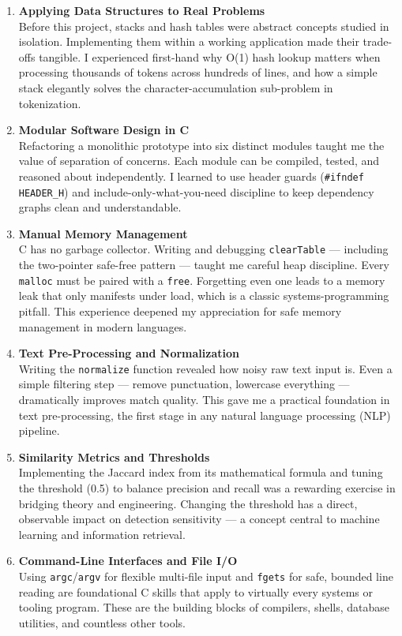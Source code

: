 \documentclass[12pt,a4paper]{article}
\begin{document}
\begin{enumerate}[leftmargin=1.8cm, label=\textbf{\arabic*.}, itemsep=8pt]

  \item \textbf{Applying Data Structures to Real Problems}\\
  Before this project, stacks and hash tables were abstract concepts studied in isolation. Implementing them within a working application made their trade-offs tangible. I experienced first-hand why O(1) hash lookup matters when processing thousands of tokens across hundreds of lines, and how a simple stack elegantly solves the character-accumulation sub-problem in tokenization.

  \item \textbf{Modular Software Design in C}\\
  Refactoring a monolithic prototype into six distinct modules taught me the value of separation of concerns. Each module can be compiled, tested, and reasoned about independently. I learned to use header guards (\texttt{\#ifndef HEADER\_H}) and include-only-what-you-need discipline to keep dependency graphs clean and understandable.

  \item \textbf{Manual Memory Management}\\
  C has no garbage collector. Writing and debugging \texttt{clearTable} — including the two-pointer safe-free pattern — taught me careful heap discipline. Every \texttt{malloc} must be paired with a \texttt{free}. Forgetting even one leads to a memory leak that only manifests under load, which is a classic systems-programming pitfall. This experience deepened my appreciation for safe memory management in modern languages.

  \item \textbf{Text Pre-Processing and Normalization}\\
  Writing the \texttt{normalize} function revealed how noisy raw text input is. Even a simple filtering step — remove punctuation, lowercase everything — dramatically improves match quality. This gave me a practical foundation in text pre-processing, the first stage in any natural language processing (NLP) pipeline.

  \item \textbf{Similarity Metrics and Thresholds}\\
  Implementing the Jaccard index from its mathematical formula and tuning the threshold (0.5) to balance precision and recall was a rewarding exercise in bridging theory and engineering. Changing the threshold has a direct, observable impact on detection sensitivity — a concept central to machine learning and information retrieval.

  \item \textbf{Command-Line Interfaces and File I/O}\\
  Using \texttt{argc}/\texttt{argv} for flexible multi-file input and \texttt{fgets} for safe, bounded line reading are foundational C skills that apply to virtually every systems or tooling program. These are the building blocks of compilers, shells, database utilities, and countless other tools.

\end{enumerate}
\end{document}
